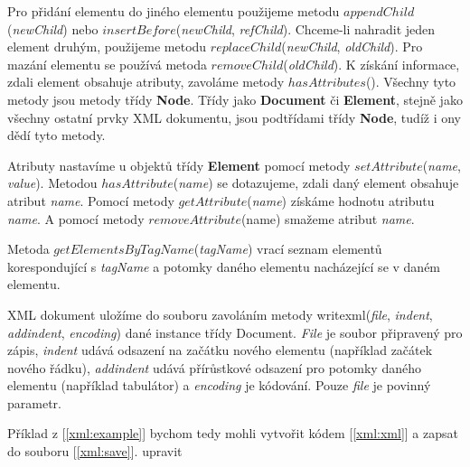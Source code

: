 Pro přidání elementu do jiného elementu použijeme metodu $appendChild$(\textit{newChild}) nebo $insertBefore$(\textit{newChild}, \textit{refChild}). Chceme-li nahradit jeden element druhým, použijeme metodu $replaceChild$(\textit{newChild}, \textit{oldChild}). Pro mazání elementu se používá metoda $removeChild$(\textit{oldChild}). K získání informace, zdali element obsahuje atributy, zavoláme metody $hasAttributes$(). Všechny tyto metody jsou metody třídy \textbf{Node}. Třídy jako \textbf{Document} či \textbf{Element}, stejně jako všechny ostatní prvky XML dokumentu, jsou podtřídami třídy \textbf{Node}, tudíž i ony dědí tyto metody.

Atributy nastavíme u objektů třídy \textbf{Element} pomocí metody $setAttribute$(\textit{name}, \textit{value}). Metodou $hasAttribute$(\textit{name}) se dotazujeme, zdali daný element obsahuje atribut \textit{name}. Pomocí metody $getAttribute$(\textit{name}) získáme hodnotu atributu \textit{name}. A pomocí metody $removeAttribute$(name) smažeme atribut \textit{name}.

Metoda $getElementsByTagName$(\textit{tagName}) vrací seznam elementů korespondující s \textit{tagName} a potomky daného elementu nacházející se v daném elementu.

XML dokument uložíme do souboru zavoláním metody writexml(\textit{file}, \textit{indent}, \textit{addindent}, \textit{encoding}) dané instance třídy Document. \textit{File} je soubor připravený pro zápis, \textit{indent} udává odsazení na začátku nového elementu (například začátek nového řádku), \textit{addindent} udává přírůstkové odsazení pro potomky daného elementu (například tabulátor) a \textit{encoding} je kódování. Pouze \textit{file} je povinný parametr. 

Příklad z [\autoref{xml:example}] bychom tedy mohli vytvořit kódem [\autoref{xml:xml}] a zapsat do souboru [\autoref{xml:save}]. {\color{red}upravit}\\

